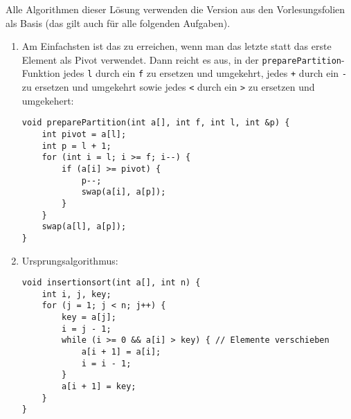 \documentclass[11pt,a4paper]{article}
\begin{document}
\begin{loesung}
    Alle Algorithmen dieser Lösung verwenden die Version aus den Vorlesungsfolien als Basis (das gilt auch für alle folgenden Aufgaben).
    \begin{enumerate}
        \item
        Am Einfachsten ist das zu erreichen, wenn man das letzte statt das erste Element als Pivot verwendet. Dann reicht es aus, in der \texttt{preparePartition}-Funktion jedes \texttt{l} durch ein \texttt{f} zu ersetzen und umgekehrt, jedes \texttt{+} durch ein \texttt{-} zu ersetzen und umgekehrt sowie jedes \texttt{<} durch ein \texttt{>} zu ersetzen und umgekehert:
        \begin{lstlisting}
void preparePartition(int a[], int f, int l, int &p) {
    int pivot = a[l];
    int p = l + 1;
    for (int i = l; i >= f; i--) {
        if (a[i] >= pivot) {
            p--;
            swap(a[i], a[p]);
        }
    }
    swap(a[l], a[p]);
}
        \end{lstlisting}

        \item Ursprungsalgorithmus:
        \begin{lstlisting}
void insertionsort(int a[], int n) {
    int i, j, key;
    for (j = 1; j < n; j++) {
        key = a[j];
        i = j - 1;
        while (i >= 0 && a[i] > key) { // Elemente verschieben
            a[i + 1] = a[i];
            i = i - 1;
        }
        a[i + 1] = key;
    }
} 
        \end{lstlisting}
        

\end{enumerate}
\end{loesung}
\end{document}
